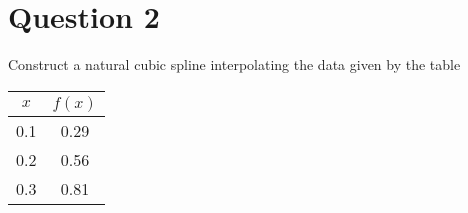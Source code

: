 \section{Question 2}

\begin{question}
    Construct a natural cubic spline interpolating the data given by the table \begin{tabular}{c|c} $x$ & $f(x)$ \\ \hline 0.1 & 0.29 \\ 0.2 & 0.56 \\ 0.3 & 0.81 \end{tabular}
\end{question}

\begin{answer}
    
\end{answer}
